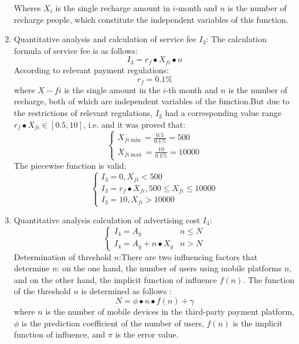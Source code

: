 \documentclass[../mcmpaper]{subfiles}
\begin{document}
\begin{enumerate}[label=\arabic*)]
Wheres $X_i$ is the single recharge amount in $i$-month  and $n$ is the number of recharge people, which constitute the independent variables of this function.
    \item Quantitative analysis and calculation of service fee $I_3$: The calculation formula of service fee is as follows:
\begin{equation}
I_3=r_f\bullet X_{fi}\bullet n
\end{equation}
According to relevant payment regulations:
\begin{equation}
r_f=0.1\%
\end{equation}
where $X-fi$ is the single amount in the $i$-th month and $n$ is the number of recharge, both of which are independent variables of the function.But due to the restrictions of relevant regulations, $I_3$ had a corresponding value range $r_f\bullet X_{fi}\in [0.5, 10]$, i.e. and it was proved that:
\begin{equation}
\left\{\begin{array}{l}
X_{f i \min }=\frac{0.5}{0.1 \%}=500 \\
X_{f i \max }=\frac{10}{0.1 \%}=10000
\end{array}\right.
\end{equation}
The piecewise function is valid:
\begin{equation}
\left\{\begin{array}{l}
I_{3}=0, X_{f i}<500 \\
I_{3}=r_{f} \bullet X_{f i}, 500 \leq X_{f i} \leq 10000 \\
I_{3}=10, X_{f i}>10000
\end{array}\right.
\end{equation}
    \item Quantitative analysis calculation of advertising cost $I_4$:
\begin{equation}
\begin{cases}I_{4}=A_{g} & n \leq N \\ I_{4}=A_{g}+n \bullet X_{g} & n>N\end{cases}
\end{equation}
Determination of threshold $n$:There are two influencing factors that determine $n$: on the one hand, the number of users using mobile platforms $n$, and on the other hand, the implicit function of influence $f(n)$.
The function of the threshold $n$ is determined as follows :
\begin{equation}
N=\phi\bullet n\bullet f(n) + \gamma
\end{equation}
where $n$ is the number of mobile devices in the third-party payment platform, $\phi$ is the prediction coefficient of the number of users, $f(n)$ is the implicit function of influence, and $\pi$ is the error value.
\end{enumerate}
\end{document}

